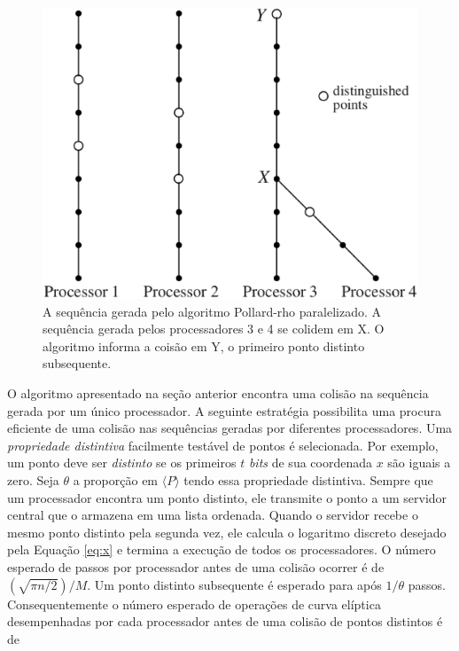 \begin{figure}[h]
\centering
\includegraphics[scale=0.4, bb=0 0 737 604]{figuras/paralellized.eps}
\caption{A sequência gerada pelo algoritmo Pollard-rho paralelizado. A sequência gerada pelos processadores 3 e 4 se colidem em X. O algoritmo informa a coisão em Y, o primeiro ponto distinto subsequente.}
\label{fig:paralellized}
\end{figure}

O algoritmo apresentado na seção anterior encontra uma colisão na sequência gerada por um único processador. A seguinte estratégia possibilita uma procura eficiente de uma colisão nas sequências geradas por diferentes processadores. Uma \textit{propriedade distintiva} facilmente testável de pontos é selecionada. Por exemplo, um ponto deve ser \textit{distinto} se os primeiros \(t\) \textit{bits} de sua coordenada \(x\) são iguais a zero. Seja \(\theta\) a proporção em $\langle P \rangle$ tendo essa propriedade distintiva. Sempre que um processador encontra um ponto distinto, ele transmite o ponto a um servidor central que o armazena em uma lista ordenada. Quando o servidor recebe o mesmo ponto distinto pela segunda vez, ele calcula o logaritmo discreto desejado pela Equação \ref{eq:x} e termina a execução de todos os processadores. O número esperado de passos por processador antes de uma colisão ocorrer é de $(\sqrt{\pi n/2})/M$. Um ponto distinto subsequente é esperado para após $1/\theta$ passos. Consequentemente o número esperado de operações de curva elíptica desempenhadas por cada processador antes de uma colisão de pontos distintos é de

